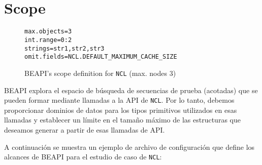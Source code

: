\\
\\
   



\section{Scope}
\label{sec:scope}

\begin{figure}[t!]
\begin{lstlisting}[keywordstyle=\scriptsize\ttfamily]
max.objects=3
int.range=0:2
strings=str1,str2,str3
omit.fields=NCL.DEFAULT_MAXIMUM_CACHE_SIZE
\end{lstlisting}
\caption{\textsf{BEAPI}'s scope definition for \texttt{NCL} (max. nodes 3)}
\label{fig:NCL-fin-BEAPI}
\end{figure}

\textsf{BEAPI} explora el espacio de búsqueda de secuencias de prueba (acotadas) que se pueden formar mediante llamadas a la API de \texttt{NCL}. Por lo tanto, debemos proporcionar dominios de datos para los tipos primitivos utilizados en esas llamadas y establecer un límite en el tamaño máximo de las estructuras que deseamos generar a partir de esas llamadas de API.

A continuación se muestra un ejemplo de archivo de configuración que define los alcances de \textsf{BEAPI} para el estudio de caso de \texttt{NCL}:


